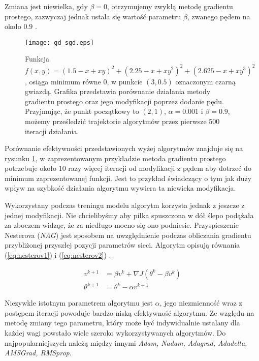 \documentclass[11pt]{book}
\theoremstyle{definition}
\begin{document}
Zmiana jest niewielka, gdy $\beta = 0$, otrzymujemy zwykłą metodę gradientu prostego, zazwyczaj jednak ustala się wartość parametru $\beta$, zwanego pędem na około $0.9$ \cite{1986Natur.323..533R}. 

\begin{figure}[h	]
	\centering
	\texttt{[image: gd\_sgd.eps]}
	\caption{Funkcja  $f(x,y) =(1.5 - x + xy)^2 + (2.25 - x + xy^2)^2 + (2.625 - x + xy^3)^2$, osiąga minimum równe 0, w punkcie $(3,0.5)$ oznaczonym  czarną gwiazdą. Grafika przedstawia porównanie działania metody gradientu prostego oraz jego modyfikacji poprzez dodanie pędu. Przyjmując, że punkt początkowy to $(2,1)$, $\alpha = 0.001$ i $\beta = 0.9$, możemy prześledzić trajektorie algorytmów przez pierwsze 500 iteracji działania.} 
	\label{fig:gd_sgd}
\end{figure}

Porównanie efektywności przedstawionych wyżej algorytmów znajduje się na rysunku \ref{fig:gd_sgd}, w zaprezentowanym przykładzie metoda gradientu prostego potrzebuje około 10 razy więcej iteracji od modyfikacji z pędem aby dotrzeć do minimum zaprezentowanej funkcji. Jest to przykład świadczący o tym jak duży wpływ na szybkość działania algorytmu wywiera ta niewieka modyfikacja. 


Wykorzystany podczas treningu modelu algorytm korzysta jednak z jeszcze z jednej modyfikacji. Nie chcielibyśmy aby piłka spuszczona w dół ślepo podążała za zboczem widząc, że za niedługo mocno się ono podniesie. Przyspieszenie Nesterova (\textit{NAG}) jest sposobem na uwzględnienie podczas obliczania gradientu przybliżonej przyszłej pozycji parametrów sieci. Algorytm opisują równania (\ref{eq:nesterov1}) i (\ref{eq:nesterov2}) \cite{2016arXiv160904747R}.

\begin{align} 
v^{k+1} &=  \beta v^{k}+ \nabla J(\theta^{k} - \beta v^{k}) \label{eq:nesterov1} \\[0.4em]
\theta^{k+1} &=  \theta^{k }- \alpha v^{k+1} \label{eq:nesterov2}
\end{align}



Niezywkle istotnym parametrem algorytmu jest $\alpha$, jego niezmienność wraz z postępem iteracji powoduje bardzo niską efektywność algorytmu. Ze względu na metodę zmiany tego parametru, który może być indywidualnie ustalany dla każdej wagi powstało wiele szeroko wykorzystywanych algorytmów. Do najpopularniejszych należą między innymi \textit{Adam, Nadam, Adagrad, Adadelta, AMSGrad, RMSprop}. 
\end{document}
